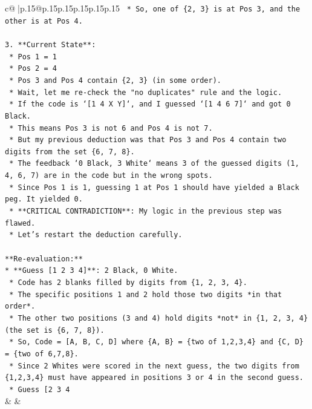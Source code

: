 \documentclass{article}
\begin{document}
{\begin{supertabular}{c@{$\;$}|p{.15\linewidth}@{}p{.15\linewidth}p{.15\linewidth}p{.15\linewidth}p{.15\linewidth}p{.15\linewidth}}
{{{\texttt{    *   So, one of \{2, 3\} is at Pos 3, and the other is at Pos 4.} \\
\\ 
\texttt{3.  **Current State**:} \\
\texttt{    *   Pos 1 = 1} \\
\texttt{    *   Pos 2 = 4} \\
\texttt{    *   Pos 3 and Pos 4 contain \{2, 3\} (in some order).} \\
\texttt{    *   Wait, let me re{-}check the "no duplicates" rule and the logic.} \\
\texttt{    *   If the code is `{[}1 4 X Y{]}`, and I guessed `{[}1 4 6 7{]}` and got 0 Black.} \\
\texttt{    *   This means Pos 3 is not 6 and Pos 4 is not 7.} \\
\texttt{    *   But my previous deduction was that Pos 3 and Pos 4 contain two digits from the set \{6, 7, 8\}.} \\
\texttt{    *   The feedback `0 Black, 3 White` means 3 of the guessed digits (1, 4, 6, 7) are in the code but in the wrong spots.} \\
\texttt{    *   Since Pos 1 is 1, guessing 1 at Pos 1 should have yielded a Black peg. It yielded 0.} \\
\texttt{    *   **CRITICAL CONTRADICTION**: My logic in the previous step was flawed.} \\
\texttt{    *   Let's restart the deduction carefully.} \\
\\ 
\texttt{**Re{-}evaluation:**} \\
\texttt{*   **Guess {[}1 2 3 4{]}**: 2 Black, 0 White.} \\
\texttt{    *   Code has 2 blanks filled by digits from \{1, 2, 3, 4\}.} \\
\texttt{    *   The specific positions 1 and 2 hold those two digits *in that order*.} \\
\texttt{    *   The other two positions (3 and 4) hold digits *not* in \{1, 2, 3, 4\} (the set is \{6, 7, 8\}).} \\
\texttt{    *   So, Code = {[}A, B, C, D{]} where \{A, B\} = \{two of 1,2,3,4\} and \{C, D\} = \{two of 6,7,8\}.} \\
\texttt{    *   Since 2 Whites were scored in the next guess, the two digits from \{1,2,3,4\} must have appeared in positions 3 or 4 in the second guess.} \\
\texttt{    *   Guess {[}2 3 4} \\
            }
        }
    }
    & & \\ \\


\end{supertabular}}
\end{document}

